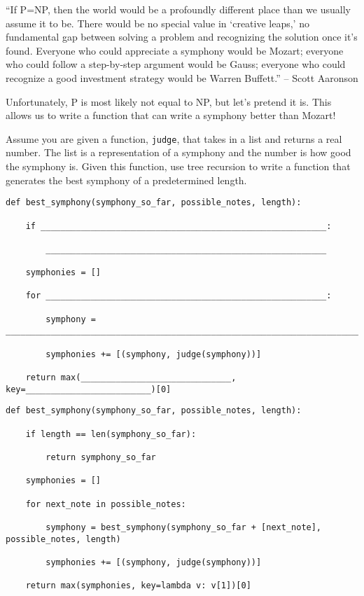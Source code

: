 \begin{blocksection}
\question ``If P=NP, then the world would be a profoundly different place than
we usually assume it to be. There would be no special value in `creative
leaps,' no fundamental gap between solving a problem and recognizing the
solution once it's found. Everyone who could appreciate a symphony would be
Mozart; everyone who could follow a step-by-step argument would be Gauss;
everyone who could recognize a good investment strategy would be Warren
Buffett.'' -- Scott Aaronson

Unfortunately, P is most likely not equal to NP, but let's pretend it is. This
allows us to write a function that can write a symphony better than Mozart!

Assume you are given a function, \lstinline$judge$, that takes in a list and
returns a real number. The list is a representation of a symphony and the
number is how good the symphony is. Given this function, use tree recursion to
write a function that generates the best symphony of a predetermined length.

\ifprintanswers\else
\begin{lstlisting}
def best_symphony(symphony_so_far, possible_notes, length):

    if _________________________________________________________:

        ________________________________________________________

    symphonies = []

    for ________________________________________________________:

        symphony = ____________________________________________________________________________

        symphonies += [(symphony, judge(symphony))]

    return max(______________________________, key=_________________________)[0]
\end{lstlisting}
\fi

\begin{solution}
\begin{lstlisting}
def best_symphony(symphony_so_far, possible_notes, length):

    if length == len(symphony_so_far):

        return symphony_so_far

    symphonies = []

    for next_note in possible_notes:

        symphony = best_symphony(symphony_so_far + [next_note], possible_notes, length)

        symphonies += [(symphony, judge(symphony))]

    return max(symphonies, key=lambda v: v[1])[0]
\end{lstlisting}
\end{solution}
\end{blocksection}

